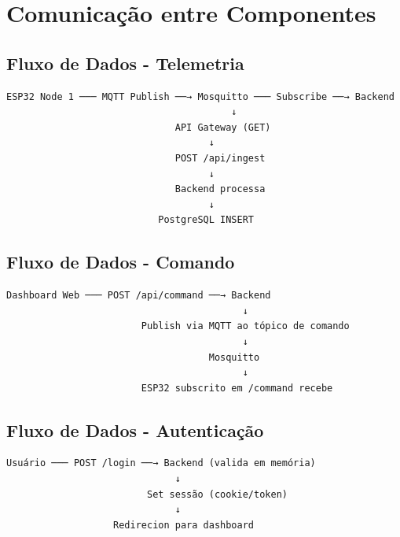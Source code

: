 \documentclass[12pt,a4paper,oneside]{report}
\begin{document}
\chapter{Comunicação entre Componentes}

\section{Fluxo de Dados - Telemetria}

\begin{verbatim}
ESP32 Node 1 ─── MQTT Publish ──→ Mosquitto ─── Subscribe ──→ Backend
                                        ↓
                              API Gateway (GET)
                                    ↓
                              POST /api/ingest
                                    ↓
                              Backend processa
                                    ↓
                           PostgreSQL INSERT
\end{verbatim}

\section{Fluxo de Dados - Comando}

\begin{verbatim}
Dashboard Web ─── POST /api/command ──→ Backend
                                          ↓
                        Publish via MQTT ao tópico de comando
                                          ↓
                                    Mosquitto
                                          ↓
                        ESP32 subscrito em /command recebe
\end{verbatim}

\section{Fluxo de Dados - Autenticação}

\begin{verbatim}
Usuário ─── POST /login ──→ Backend (valida em memória)
                              ↓
                         Set sessão (cookie/token)
                              ↓
                   Redirecion para dashboard
\end{verbatim}

\end{document}
